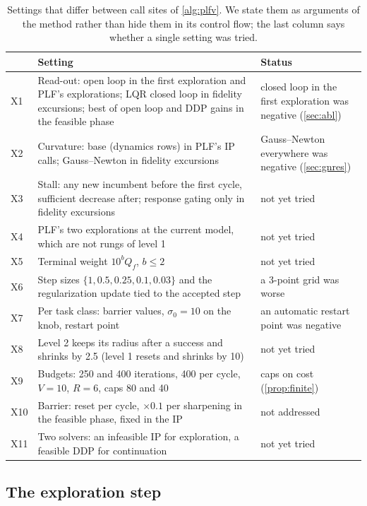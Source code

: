 \documentclass[11pt]{article}
\theoremstyle{remark}
\begin{document}
\begin{table}[t]
\centering
\caption{Settings that differ between call sites of \cref{alg:plfv}. We state them as arguments of the method rather than hide them in its control flow; the last column says whether a single setting was tried.}
\label{tab:args}
\small
\begin{tabularx}{\linewidth}{@{}lXX@{}}
\toprule
 & Setting & Status \\
\midrule
X1 & Read-out: open loop in the first exploration and PLF's explorations; LQR closed loop in fidelity excursions; best of open loop and DDP gains in the feasible phase & closed loop in the first exploration was negative (\cref{sec:abl}) \\
X2 & Curvature: base (dynamics rows) in PLF's IP calls; Gauss--Newton in fidelity excursions & Gauss--Newton everywhere was negative (\cref{sec:gnres}) \\
X3 & Stall: any new incumbent before the first cycle, sufficient decrease after; response gating only in fidelity excursions & not yet tried \\
X4 & PLF's two explorations at the current model, which are not rungs of level 1 & not yet tried \\
X5 & Terminal weight $10^b Q_f$, $b \leq 2$ & not yet tried \\
X6 & Step sizes $\{1, 0.5, 0.25, 0.1, 0.03\}$ and the regularization update tied to the accepted step & a 3-point grid was worse \\
X7 & Per task class: barrier values, $\sigma_0 = 10$ on the knob, restart point & an automatic restart point was negative \\
X8 & Level 2 keeps its radius after a success and shrinks by 2.5 (level 1 resets and shrinks by 10) & not yet tried \\
X9 & Budgets: 250 and 400 iterations, 400 per cycle, $V = 10$, $R = 6$, caps 80 and 40 & caps on cost (\cref{prop:finite}) \\
X10 & Barrier: reset per cycle, $\times 0.1$ per sharpening in the feasible phase, fixed in the IP & not addressed \\
X11 & Two solvers: an infeasible IP for exploration, a feasible DDP for continuation & not yet tried \\
\bottomrule
\end{tabularx}
\end{table}

\subsection{The exploration step}
\label{sec:explore}
\end{document}
